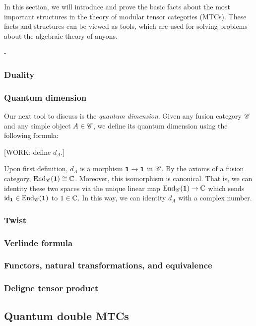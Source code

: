 \documentclass{article}
\theoremstyle{definition}
\numberwithin{figure}{section}
\begin{document}
In this section, we will introduce and prove the basic facts about the most important structures in the theory of modular tensor categories (MTCs). These facts and structures can be viewed as tools, which are used for solving problems about the algebraic theory of anyons. 

 -
\subsubsection{Duality}

\subsubsection{Quantum dimension}

Our next tool to discuss is the \textit{quantum dimension}. Given any fusion category $\mathscr{C}$ and any simple object $A\in \mathscr{C}$, we define its quantum dimension using the following formula:

[WORK: define $d_A$.]

Upon first definition, $d_A$ is a morphism $\mathbf{1}\to \mathbf{1}$ in $\mathscr{C}$. By the axioms of a fusion category, $\mathrm{End}_{\mathscr{C}}(\mathbf{1})\cong \mathbb{C}$. Moreover, this isomorphism is canonical. That is, we can identity these two spaces via the unique linear map
$\mathrm{End}_{\mathscr{C}}(\mathbf{1})\to \mathbb{C}$ which sends $\mathrm{id}_{\mathbf{1}}\in \mathrm{End}_{\mathscr{C}}(\mathbf{1})$ to $1\in \mathbb{C}$. In this way, we can identity $d_A$ with a complex number.

\subsubsection{Twist}

\subsubsection{Verlinde formula}

\subsubsection{Functors, natural transformations, and equivalence}

\subsubsection{Deligne tensor product}



\subsection{Quantum double MTCs}
\end{document}
